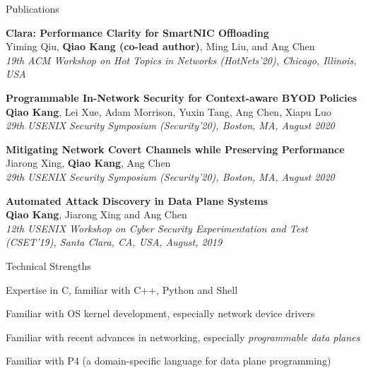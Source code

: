 \documentclass{resume} %
\begin{document}

\begin{rSection}{Publications}

\item {\bf Clara: Performance Clarity for SmartNIC Offloading}\\
Yiming Qiu, {\bf Qiao Kang (co-lead author)}, Ming Liu, and Ang Chen \\
{\em 19th ACM Workshop on Hot Topics in Networks (HotNets'20), Chicago, Illinois, USA}

\item {\bf Programmable In-Network Security for Context-aware BYOD Policies}\\
{\bf Qiao Kang}, Lei Xue, Adam Morrison, Yuxin Tang, Ang Chen, Xiapu Luo\\
{\em 29th USENIX Security Symposium (Security'20), Boston, MA, August 2020}

\item {\bf Mitigating Network Covert Channels while Preserving Performance}\\
Jiarong Xing, {\bf Qiao Kang}, Ang Chen\\
{\em 29th USENIX Security Symposium (Security'20), Boston, MA, August 2020}

\item {\bf Automated Attack Discovery in Data Plane Systems}\\
{\bf Qiao Kang}, Jiarong Xing and Ang Chen\\
{\em 12th USENIX Workshop on Cyber Security Experimentation and Test (CSET'19), Santa Clara, CA, USA, August, 2019}

\end{rSection}


\begin{rSection}{Technical Strengths} \itemsep -3pt

\item Expertise in C, familiar with C++, Python and Shell
\item Familiar with OS kernel development, especially network device drivers
\item Familiar with recent advances in networking, especially {\em programmable data planes}
\item Familiar with P4 (a domain-specific language for data plane programming)

\end{rSection}
\end{document}
